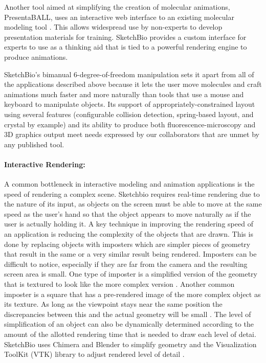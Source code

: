 \documentclass[twocolumn]{bmcart}%
\begin{document}
Another tool aimed at simplifying the creation of molecular animations, PresentaBALL\cite{nickelspresentaball}, uses an interactive web interface to an existing molecular modeling tool \cite{nickelspresentaball}.
This allows widespread use by non-experts to develop presentation materials for training.  SketchBio provides a custom interface for experts to use as a thinking aid that is tied to a powerful rendering engine to produce animations.

SketchBio's bimanual 6-degree-of-freedom manipulation sets it apart from all of the applications described above because it lets the user move molecules and craft animations much faster and more naturally than tools that use a mouse and keyboard to manipulate objects. Its support of appropriately-constrained layout using several features (configurable collision detection, spring-based layout,  and crystal by example) and its ability to produce both fluorescence-microscopy and 3D graphics output meet needs expressed by our collaborators that are unmet by any published tool.

\paragraph*{Interactive Rendering:}
A common bottleneck in interactive modeling and animation applications is the speed of rendering a complex scene.
Sketchbio requires real-time rendering due to the nature of its input, as objects on the screen must be able to move at the same speed as the user's hand so that the object appears to move naturally as if the user is actually holding it. 
A key technique in improving the rendering speed of an application is reducing the complexity of the objects that are drawn.
This is done by replacing objects with imposters which are simpler pieces of geometry that result in the same or a very similar result being rendered.
Imposters can be difficult to notice, especially if they are far from the camera and the resulting screen area is small.
One type of imposter is a simplified version of the geometry that is textured to look like the more complex version \cite{decoret2003billboard,erikson1998simplification,cohen1998appearance}.
Another common imposter is a square that has a pre-rendered image of the more complex object as its texture.  As long as the viewpoint stays near the same position the discrepancies between this and the actual geometry will be small \cite{aliaga1996visualization,maciel1995visual}.
The level of simplification of an object can also be dynamically determined according to the amount of the allotted rendering time that is needed to draw each level of detai.  SketchBio uses Chimera and Blender to simplify geometry and the Visualization ToolKit (VTK) library to adjust rendered level of detail \cite{VTKbook}.
\end{document}
